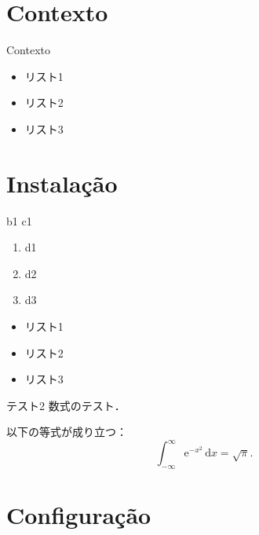 \documentclass{beamer}
\begin{document}
\section{Contexto}
\begin{frame}{Contexto}
 \begin{itemize}
  \item リスト1\pause
  \item リスト2\pause
  \item リスト3
  \end{itemize}
\end{frame}



\section{Instalação}

\begin{frame}{b1}
  c1

  \pause

  \begin{enumerate}
  \item d1\pause
  \item d2\pause
  \item d3
  \end{enumerate}

  \pause

  \begin{itemize}
  \item リスト1\pause
  \item リスト2\pause
  \item リスト3
  \end{itemize}
\end{frame}

\begin{frame}{テスト2}
  数式のテスト．

  \begin{theorem}[Gauss積分]
    以下の等式が成り立つ：
    \begin{equation}
      \int_{-\infty}^\infty \mathrm{e}^{-x^2}\,\mathrm{d}x=\sqrt{\pi}.
    \end{equation}
  \end{theorem}
\end{frame}


\section{Configuração}
\end{document}
